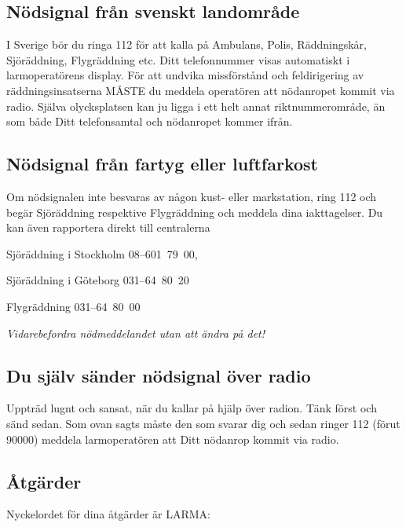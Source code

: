 \subsection{Nödsignal från svenskt landområde}

I Sverige bör du ringa 112 för att kalla på Ambulans, Polis,
Räddningskår, Sjöräddning, Flygräddning etc. Ditt telefonnummer visas
automatiskt i larmoperatörens display.  För att undvika missförstånd och
feldirigering av räddningsinsatserna MÅSTE du meddela operatören att nödanropet
kommit via radio. Själva olycksplatsen kan ju ligga i ett helt annat
riktnummerområde, än som både Ditt telefonsamtal och nödanropet kommer ifrån.

\subsection{Nödsignal från fartyg eller luftfarkost}

Om nödsignalen inte besvaras av någon kust- eller markstation, ring 112
och begär Sjöräddning respektive Flygräddning och meddela dina
iakttagelser. Du kan även rapportera direkt till centralerna

Sjöräddning i Stockholm 08--601~79~00,

Sjöräddning i Göteborg 031--64~80~20

Flygräddning 031--64~80~00

\emph{Vidarebefordra nödmeddelandet utan att ändra på det!}

\subsection{Du själv sänder nödsignal över radio}

Uppträd lugnt och sansat, när du kallar på hjälp över radion. Tänk först och
sänd sedan. Som ovan sagts måste den som svarar dig och sedan ringer 112 (förut
90000) meddela larmoperatören att Ditt nödanrop kommit via radio.

\subsection{Åtgärder}

Nyckelordet för dina åtgärder är LARMA:

